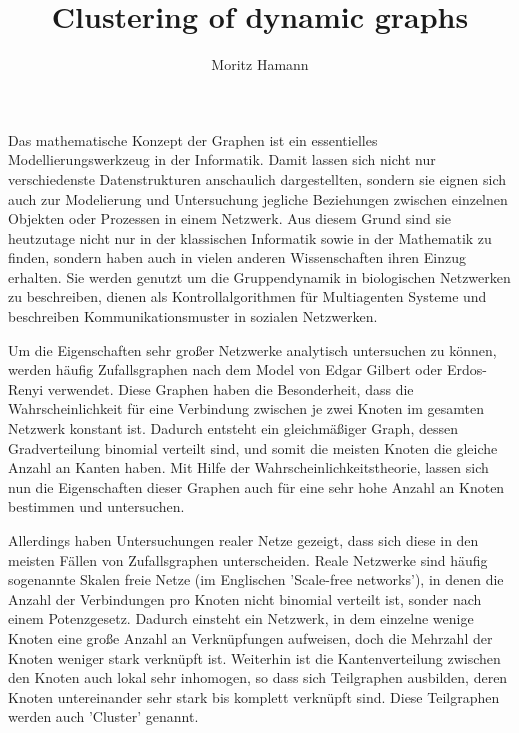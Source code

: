 \documentclass[journal]{vgtc}
\author{Moritz Hamann}
\title{Clustering of dynamic graphs}
\begin{document}

\maketitle

  Das mathematische Konzept der Graphen ist ein essentielles 
  Modellierungswerkzeug in der Informatik. Damit lassen sich nicht nur
  verschiedenste Datenstrukturen anschaulich dargestellten, sondern
  sie eignen sich auch zur Modelierung und Untersuchung jegliche Beziehungen zwischen einzelnen
  Objekten oder Prozessen in einem Netzwerk.
  Aus diesem Grund sind sie heutzutage nicht nur in der klassischen Informatik
  sowie in der Mathematik zu finden, sondern haben auch in vielen anderen
  Wissenschaften ihren Einzug erhalten. Sie werden genutzt um die
  Gruppendynamik in biologischen Netzwerken zu beschreiben, dienen
  als Kontrollalgorithmen für Multiagenten Systeme \cite{graphcontrol} und beschreiben
  Kommunikationsmuster in sozialen Netzwerken.
  
  Um die Eigenschaften sehr großer Netzwerke analytisch untersuchen zu können,
  werden häufig Zufallsgraphen nach dem Model von Edgar Gilbert oder
  Erdos-Renyi verwendet. Diese Graphen haben die Besonderheit, dass die 
  Wahrscheinlichkeit für eine Verbindung zwischen je zwei Knoten im 
  gesamten Netzwerk konstant ist. Dadurch entsteht ein gleichmäßiger Graph,
  dessen Gradverteilung binomial verteilt sind, und somit die meisten Knoten 
  die gleiche Anzahl an Kanten haben. Mit Hilfe der Wahrscheinlichkeitstheorie,
  lassen sich nun die Eigenschaften dieser Graphen auch für eine sehr hohe Anzahl
  an Knoten bestimmen und untersuchen.
  
  Allerdings haben Untersuchungen realer Netze gezeigt, dass sich
  diese in den meisten Fällen von Zufallsgraphen unterscheiden. Reale Netzwerke sind
  häufig sogenannte Skalen freie Netze (im Englischen 'Scale-free networks'), in 
  denen die Anzahl der Verbindungen pro Knoten nicht binomial verteilt ist, sonder nach einem
  Potenzgesetz. Dadurch einsteht ein Netzwerk, in dem einzelne wenige Knoten eine große
  Anzahl an Verknüpfungen aufweisen, doch die Mehrzahl der Knoten weniger stark verknüpft ist. 
  Weiterhin ist die Kantenverteilung zwischen den Knoten auch lokal sehr inhomogen, so dass sich 
  Teilgraphen ausbilden, deren Knoten untereinander sehr stark bis komplett verknüpft sind.
  Diese Teilgraphen werden auch 'Cluster' genannt.
\end{document}

